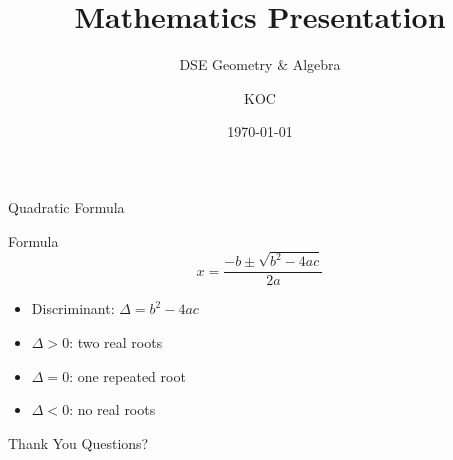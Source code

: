 \documentclass[aspectratio=169,12pt]{beamer}
\title{Mathematics Presentation}
\subtitle{DSE Geometry \& Algebra}
\author{KOC}
\date{\today}
\begin{document}
\begin{frame}
  \titlepage
\end{frame}

\begin{frame}{Quadratic Formula}
  \begin{block}{Formula}
    \[
      x = \frac{-b \pm \sqrt{b^2 - 4ac}}{2a}
    \]
  \end{block}
  \begin{itemize}
    \item Discriminant: $\Delta = b^2 - 4ac$
    \item $\Delta > 0$: two real roots
    \item $\Delta = 0$: one repeated root
    \item $\Delta < 0$: no real roots
  \end{itemize}
\end{frame}

\begin{frame}{Thank You}
  \centering
  \Large Questions?
\end{frame}
\end{document}
